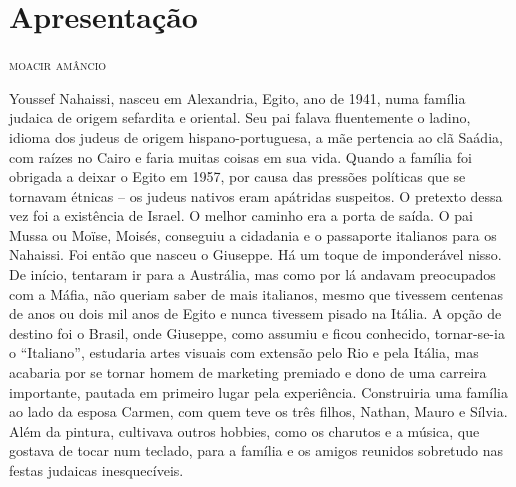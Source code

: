\chapter[Apresentação, \emph{por Moacir Amâncio}]{Apresentação }

\begin{flushright}
\textsc{moacir amâncio}
\end{flushright}

Youssef Nahaissi, nasceu em Alexandria, Egito, ano de 1941, numa família
judaica de origem sefardita e oriental. Seu pai falava fluentemente o
ladino, idioma dos judeus de origem hispano-portuguesa, a mãe pertencia
ao clã Saádia, com raízes no Cairo e faria muitas coisas em sua vida.
Quando a família foi obrigada a deixar o Egito em 1957, por causa das
pressões políticas que se tornavam étnicas -- os judeus nativos eram
apátridas suspeitos. O pretexto dessa vez foi a existência de Israel. O
melhor caminho era a porta de saída. O pai Mussa ou Moïse, Moisés,
conseguiu a cidadania e o passaporte italianos para os Nahaissi. Foi
então que nasceu o Giuseppe. Há um toque de imponderável nisso. De
início, tentaram ir para a Austrália, mas como por lá andavam
preocupados com a Máfia, não queriam saber de mais italianos, mesmo que
tivessem centenas de anos ou dois mil anos de Egito e nunca tivessem
pisado na Itália. A opção de destino foi o Brasil, onde Giuseppe, como
assumiu e ficou conhecido, tornar-se-ia o ``Italiano'', estudaria artes
visuais com extensão pelo Rio e pela Itália, mas acabaria por se tornar
homem de marketing premiado e dono de uma carreira importante, pautada
em primeiro lugar pela experiência. Construiria uma família ao lado da
esposa Carmen, com quem teve os três filhos, Nathan, Mauro e Sílvia.
Além da pintura, cultivava outros hobbies, como os charutos e a música,
que gostava de tocar num teclado, para a família e os amigos reunidos
sobretudo nas festas judaicas inesquecíveis.

